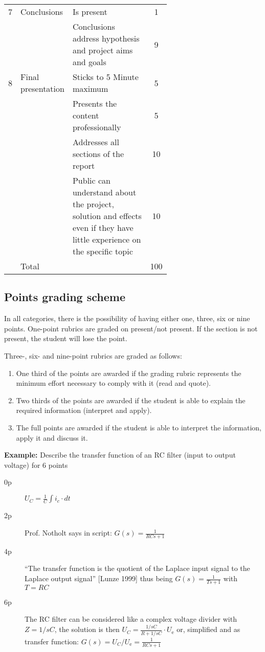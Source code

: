 \begin{table*}[h]
\begin{tabular}{l p{0.13\linewidth} p{0.5\linewidth} c}
			7 & Conclusions & Is present & 1 \\
			\cline{3-4}
			& & Conclusions address hypothesis and project aims and goals & 9 \\
			\hline
			8 & Final presentation & Sticks to 5 Minute maximum & 5 \\
			\cline{3-4}
			&& Presents the content professionally & 5\\
			\cline{3-4}
			&& Addresses all sections of the report & 10 \\
			\cline{3-4}
			&& Public can understand about the project, solution and effects even if they have little experience on the specific topic & 10\\
			\hline
			\hline
			 & Total & & 100 \\
		\end{tabular}
	\end{table*}

	\subsection{Points grading scheme}
	
	In all categories, there is the possibility of having either one, three, six or nine points. One-point rubrics are graded on present/not present. If the section is not present, the student will lose the point.
	
	Three-, six- and nine-point rubrics are graded as follows:
	
	\begin{enumerate}
		\item One third of the points are awarded if the grading rubric represents the minimum effort necessary to comply with it (read and quote).
		\item Two thirds of the points are awarded if the student is able to explain the required information  (interpret and apply).
		\item The full points are awarded if the student is able to interpret the information, apply it and discuss it.
	\end{enumerate}

	{\bfseries Example:} Describe the transfer function of an RC filter (input to output voltage) for 6 points
	
	\begin{description}
		\item[0p] $U_{C} = \frac{1}{C}\int i_{c} \cdot dt$
		\item[2p] Prof. Notholt says in script: $G(s) = \frac{1}{RCs+1}$
		\item[4p] ``The transfer function is the quotient of the Laplace input signal to the Laplace output signal'' [Lunze 1999] thus being $G(s) = \frac{1}{Ts+1}$ with $T=RC$
		\item[6p] The RC filter can be considered like a complex voltage divider with $Z = 1/sC$, the solution is then $U_{C} = \frac{1/sC}{R + 1/sC} \cdot U_\textrm{e}$ or, simplified and as transfer function: $G(s) = U_{C}/U_\textrm{e} = \frac{1}{RCs + 1}$ 
	\end{description}
	
